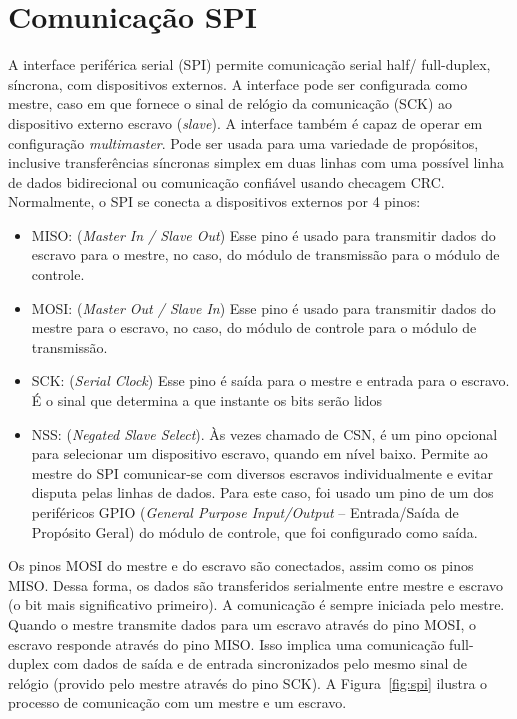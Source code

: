 \chapter{Comunicação SPI}\label{cap:com_spi}

A interface periférica serial (SPI) permite comunicação serial half/ full-duplex, síncrona, com dispositivos externos. A interface pode ser configurada como mestre, caso em que fornece o sinal de relógio da comunicação (SCK) ao dispositivo externo escravo (\textit{slave}). A interface também é capaz de operar em configuração \textit{multimaster}.
Pode ser usada para uma variedade de propósitos, inclusive transferências síncronas simplex em duas linhas com uma possível linha de dados bidirecional ou comunicação confiável usando checagem CRC.
Normalmente, o SPI se conecta a dispositivos externos por 4 pinos:
\begin{itemize}
\item MISO: (\textit{Master In / Slave Out}) Esse pino é usado para transmitir dados do escravo para o mestre, no caso, do módulo de transmissão para o módulo de controle.
\item MOSI: (\textit{Master Out / Slave In}) Esse pino é usado para transmitir dados do mestre para o escravo, no caso, do módulo de controle para o módulo de transmissão.
\item SCK: (\textit{Serial Clock}) Esse pino é saída para o mestre e entrada para o escravo. É o sinal que determina a que instante os bits serão lidos
\item NSS: (\textit{Negated Slave Select}). Às vezes chamado de CSN, é um pino opcional para selecionar um dispositivo escravo, quando em nível baixo. Permite ao mestre do SPI comunicar-se com diversos escravos individualmente e evitar disputa pelas linhas de dados. Para este caso, foi usado um pino de um dos periféricos GPIO (\textit{General Purpose Input/Output} – Entrada/Saída de Propósito Geral) do módulo de controle, que foi configurado como saída.
\end{itemize}

Os pinos MOSI do mestre e do escravo são conectados, assim como os pinos MISO. Dessa forma, os dados são transferidos serialmente entre mestre e escravo (o bit mais significativo primeiro).
A comunicação é sempre iniciada pelo mestre. Quando o mestre transmite dados para um escravo através do pino MOSI, o escravo responde através do pino MISO. Isso implica uma comunicação full-duplex com dados de saída e de entrada sincronizados pelo mesmo sinal de relógio (provido pelo mestre através do pino SCK).
A Figura~\ref{fig:spi} ilustra o processo de comunicação com um mestre e um escravo.

